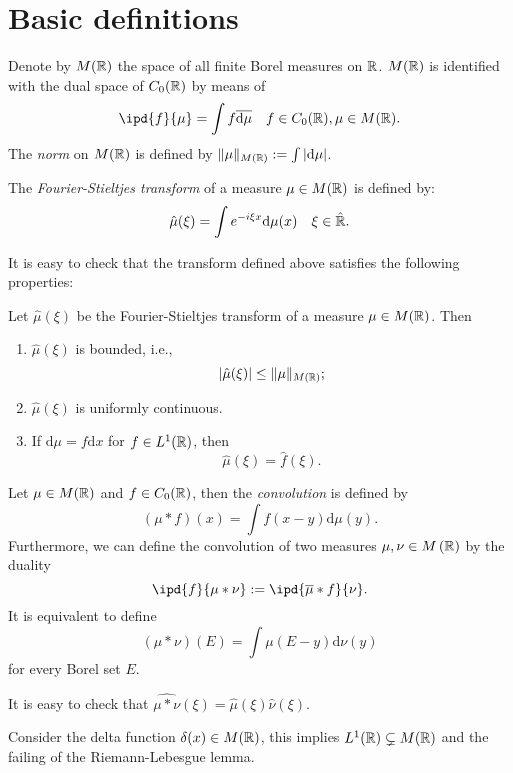 \tableofcontents
\section{Basic definitions}
Denote by $M(\mathbb{R})$ the space of all finite Borel measures on $\mathbb{R}$. $M(\mathbb{R})$ is identified with the dual space of $C_0(\mathbb{R})$ by means of 
\begin{equation}
  \ipd{f}{\mu}=\int f \overline{\mathrm{d}\mu}\quad f\in C_0(\R),\mu \in M(\R).
\end{equation}
The \textit{norm}  on $M(\mathbb{R})$ is defined by $\|\mu\|_{M(\mathbb{R})}:=\int \left| \mathrm{d}\mu \right| $. 
\begin{definition}
  The \textit{Fourier-Stieltjes transform} of a measure $\mu \in M(\mathbb{R})$ is defined by:
  \begin{equation}
    \hat{\mu}(\xi)=\int e^{-i\xi x}\mathrm{d}\mu(x)\quad \xi \in \hat{\mathbb{R}}.
  \end{equation}
\end{definition}
It is easy to check that the transform defined above satisfies the following properties:
\begin{proposition}
  Let $\hat{\mu}(\xi)$ be the Fourier-Stieltjes transform of a measure $\mu \in M(\mathbb{R})$. Then
  \begin{enumerate}
    \item $\hat{\mu}(\xi)$ is bounded, i.e.,
      \begin{equation}
	\left| \hat{\mu}(\xi) \right| \le \|\mu\|_{M(\mathbb{R})};
      \end{equation}
    \item $\hat{\mu}(\xi)$ is uniformly continuous.
    \item If $\mathrm{d}\mu=f\mathrm{d}x$ for $f \in L^1(\mathbb{R})$, then 
      \begin{equation}
	\hat{\mu}(\xi)=\hat{f}(\xi).
      \end{equation}
  \end{enumerate}
\end{proposition}

\begin{definition}
  Let $\mu \in M(\mathbb{R})$ and $f \in C_0(\mathbb{R})$, then the \textit{convolution} is defined by 
  \begin{equation}
    \left( \mu * f \right)(x)=\int f(x-y)\mathrm{d}\mu(y). 
  \end{equation}
  Furthermore, we can define the convolution of two measures $\mu,\nu \in M\left( \mathbb{R} \right) $ by the duality
  \begin{equation}
    \ipd{f}{\mu*\nu}:=\ipd{\overline{\mu}* f}{\nu}.
  \end{equation}
  It is equivalent to define
  \begin{equation}
    \left( \mu*\nu \right) (E)=\int \mu(E-y)\mathrm{d}\nu (y)
  \end{equation}
  for every Borel set $E$. 
\end{definition}
It is easy to check that $\widehat{\mu *\nu}(\xi)=\widehat{\mu}(\xi)\widehat{\nu}(\xi)$.
\begin{remark}
  Consider the delta function $\delta(x) \in M(\mathbb{R})$, this implies $L^1(\mathbb{R})\subsetneq M(\mathbb{R})$ and the failing of the Riemann-Lebesgue lemma.
\end{remark}
